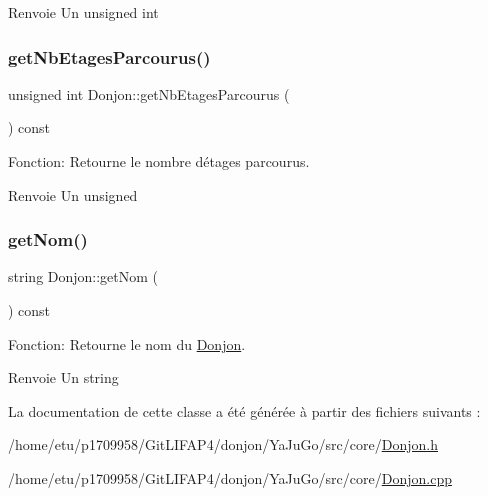 \begin{DoxyReturn}{Renvoie}
Un unsigned int 
\end{DoxyReturn}
\mbox{\label{classDonjon_a14ee54cc631289310c622540c2cda199}} 
\subsubsection{\texorpdfstring{get\+Nb\+Etages\+Parcourus()}{getNbEtagesParcourus()}}
{\footnotesize\ttfamily unsigned int Donjon\+::get\+Nb\+Etages\+Parcourus (\begin{DoxyParamCaption}{ }\end{DoxyParamCaption}) const}



Fonction\+: Retourne le nombre d\textquotesingle{}étages parcourus. 

\begin{DoxyReturn}{Renvoie}
Un unsigned 
\end{DoxyReturn}
\mbox{\label{classDonjon_ab9eb0d68d0df634cbeb931473cc31ffc}} 
\subsubsection{\texorpdfstring{get\+Nom()}{getNom()}}
{\footnotesize\ttfamily string Donjon\+::get\+Nom (\begin{DoxyParamCaption}{ }\end{DoxyParamCaption}) const}



Fonction\+: Retourne le nom du \mbox{\hyperlink{classDonjon}{Donjon}}. 

\begin{DoxyReturn}{Renvoie}
Un string 
\end{DoxyReturn}


La documentation de cette classe a été générée à partir des fichiers suivants \+:\begin{DoxyCompactItemize}
\item 
/home/etu/p1709958/\+Git\+L\+I\+F\+A\+P4/donjon/\+Ya\+Ju\+Go/src/core/\mbox{\hyperlink{Donjon_8h}{Donjon.\+h}}\item 
/home/etu/p1709958/\+Git\+L\+I\+F\+A\+P4/donjon/\+Ya\+Ju\+Go/src/core/\mbox{\hyperlink{Donjon_8cpp}{Donjon.\+cpp}}\end{DoxyCompactItemize}
